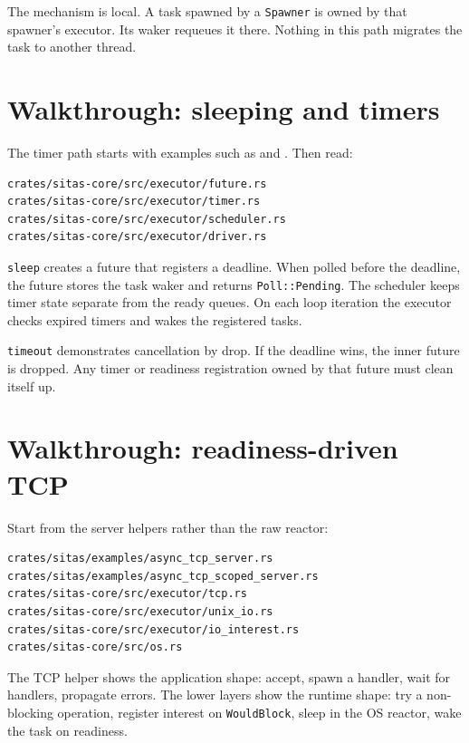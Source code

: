 The mechanism is local. A task spawned by a \texttt{Spawner} is owned by that
spawner's executor. Its waker requeues it there. Nothing in this path migrates
the task to another thread.

\section{Walkthrough: sleeping and timers}

The timer path starts with examples such as  and
. Then read:

\begin{lstlisting}[language={},caption={Timer reading path}]
crates/sitas-core/src/executor/future.rs
crates/sitas-core/src/executor/timer.rs
crates/sitas-core/src/executor/scheduler.rs
crates/sitas-core/src/executor/driver.rs
\end{lstlisting}

\texttt{sleep} creates a future that registers a deadline. When polled before
the deadline, the future stores the task waker and returns
\texttt{Poll::Pending}. The scheduler keeps timer state separate from the ready
queues. On each loop iteration the executor checks expired timers and wakes the
registered tasks.

\texttt{timeout} demonstrates cancellation by drop. If the deadline wins, the
inner future is dropped. Any timer or readiness registration owned by that
future must clean itself up.

\section{Walkthrough: readiness-driven TCP}

Start from the server helpers rather than the raw reactor:

\begin{lstlisting}[language={},caption={TCP readiness reading path}]
crates/sitas/examples/async_tcp_server.rs
crates/sitas/examples/async_tcp_scoped_server.rs
crates/sitas-core/src/executor/tcp.rs
crates/sitas-core/src/executor/unix_io.rs
crates/sitas-core/src/executor/io_interest.rs
crates/sitas-core/src/os.rs
\end{lstlisting}

The TCP helper shows the application shape: accept, spawn a handler, wait for
handlers, propagate errors. The lower layers show the runtime shape: try a
non-blocking operation, register interest on \texttt{WouldBlock}, sleep in the
OS reactor, wake the task on readiness.

